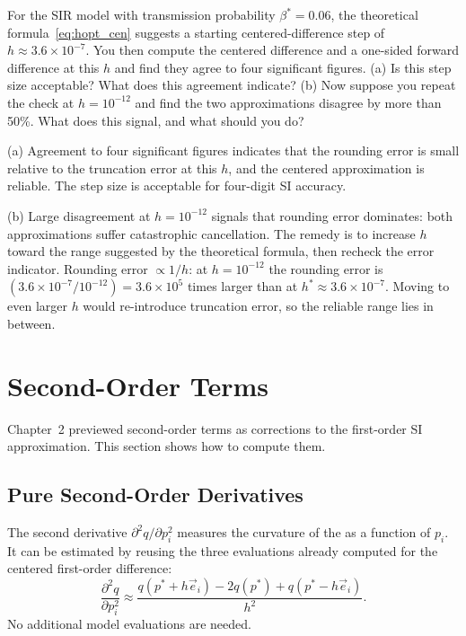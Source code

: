 \begin{selfcheck}
For the SIR model with transmission probability $\beta^* = 0.06$,
the theoretical formula~\eqref{eq:hopt_cen} suggests a starting
centered-difference step of $h \approx 3.6 \times 10^{-7}$.
You then compute the centered difference and a one-sided forward
difference at this $h$ and find they agree to four significant
figures.
(a) Is this step size acceptable? What does this agreement indicate?
(b) Now suppose you repeat the check at $h = 10^{-12}$ and find the
two approximations disagree by more than 50\%. What does this signal,
and what should you do?
\end{selfcheck}
\begin{scAnswer}
(a) Agreement to four significant figures indicates that the
rounding error is small relative to the truncation error at this
$h$, and the centered approximation is reliable.
The step size is acceptable for four-digit SI accuracy.

(b) Large disagreement at $h = 10^{-12}$ signals that rounding error
dominates: both approximations suffer catastrophic cancellation.
The remedy is to increase $h$ toward the range suggested by the
theoretical formula, then recheck the error indicator.
Rounding error $\propto 1/h$: at $h = 10^{-12}$ the rounding error
is $(3.6\times10^{-7}/10^{-12}) = 3.6\times10^5$ times larger than
at $h^* \approx 3.6\times10^{-7}$. Moving to even larger $h$ would
re-introduce truncation error, so the reliable range lies in between.
\end{scAnswer}

\section{Second-Order Terms}
\label{sec:secondordercomp}

Chapter~2 previewed second-order terms as corrections to the first-order
SI approximation. This section shows how to compute them.

\subsection{Pure Second-Order Derivatives}

The second derivative $\partial^2 q/\partial p_i^2$ measures the
curvature of the \QOI as a function of $p_i$.
It can be estimated by reusing the three evaluations already
computed for the centered first-order difference:
\begin{equation}
  \frac{\partial^2 q}{\partial p_i^2}
  \approx \frac{q(p^*+h\vec{e}_i) - 2q(p^*) + q(p^*-h\vec{e}_i)}{h^2}.
  \label{eq:second_pure}
\end{equation}
No additional model evaluations are needed.

